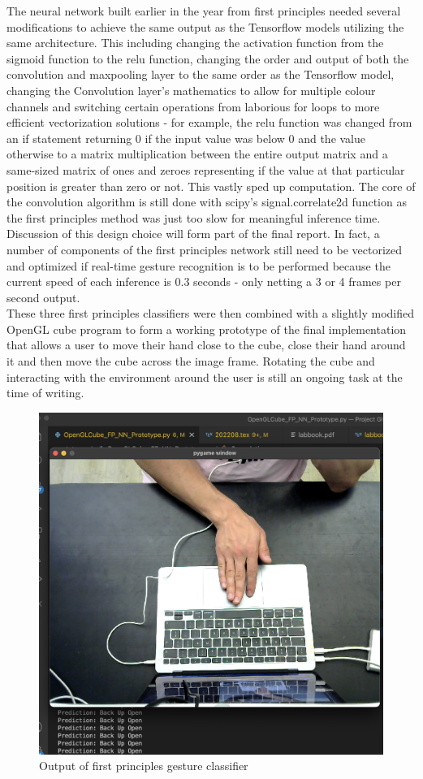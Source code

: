 The neural network built earlier in the year from first principles needed several modifications to achieve the same output as the Tensorflow models utilizing the same architecture. This including changing the activation function from the sigmoid function to the relu function, changing the order and output of both the convolution and maxpooling layer to the same order as the Tensorflow model, changing the Convolution layer's mathematics to allow for multiple colour channels and switching certain operations from laborious for loops to more efficient vectorization solutions - for example, the relu function was changed from an if statement returning 0 if the input value was below 0 and the value otherwise to a matrix multiplication between the entire output matrix and a same-sized matrix of ones and zeroes representing if the value at that particular position is greater than zero or not. This vastly sped up computation. The core of the convolution algorithm is still done with scipy's signal.correlate2d function as the first principles method was just too slow for meaningful inference time. Discussion of this design choice will form part of the final report. In fact, a number of components of the first principles network still need to be vectorized and optimized if real-time gesture recognition is to be performed because the current speed of each inference is 0.3 seconds - only netting a 3 or 4 frames per second output.\\

These three first principles classifiers were then combined with a slightly modified OpenGL cube program to form a working prototype of the final implementation that allows a user to move their hand close to the cube, close their hand around it and then move the cube across the image frame. Rotating the cube and interacting with the environment around the user is still an ongoing task at the time of writing.

\begin{figure}[h]
    \centering
    \includegraphics[width=0.7\linewidth]{figures/OpenGLCube_FP_NN_Prototype.png}
    \caption{Output of first principles gesture classifier}
    \label{fig:OpenGLCube_FP_NN_Prototype}
\end{figure}

